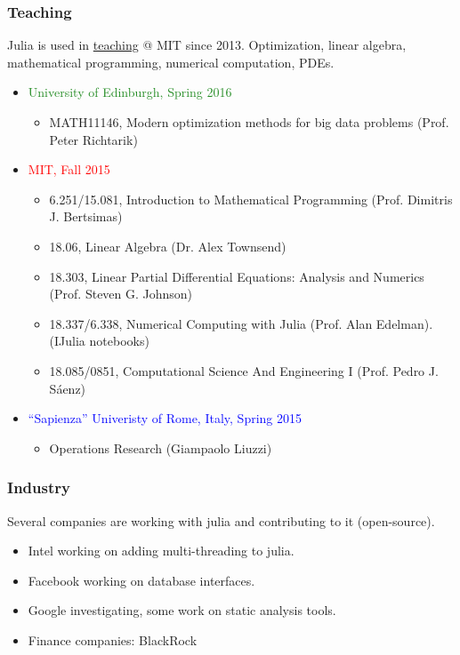 \documentclass[16pt]{beamer}
\begin{document}
\begin{frame}
\frametitle{Teaching}
Julia is used in \href{http://julialang.org/teaching/}{teaching} @ MIT since 2013.
Optimization, linear algebra, mathematical programming, numerical computation, PDEs.

\begin{itemize}
  \item \textcolor{ForestGreen}{University of Edinburgh, Spring 2016}
  \begin{itemize}
    \item MATH11146, Modern optimization methods for big data problems (Prof. Peter Richtarik)
  \end{itemize}
  
  \item \textcolor{red}{MIT, Fall 2015}
  \begin{itemize}
    \item 6.251/15.081, Introduction to Mathematical Programming (Prof. Dimitris J. Bertsimas)
    \item 18.06, Linear Algebra (Dr. Alex Townsend)
    \item 18.303, Linear Partial Differential Equations: Analysis and Numerics (Prof. Steven G. Johnson)
    \item 18.337/6.338, Numerical Computing with Julia (Prof. Alan Edelman). (IJulia notebooks)
    \item 18.085/0851, Computational Science And Engineering I (Prof. Pedro J. Sáenz)
  \end{itemize}
  
  \item \textcolor{blue}{“Sapienza” Univeristy of Rome, Italy, Spring 2015}
  \begin{itemize}
    \item Operations Research (Giampaolo Liuzzi)
  \end{itemize}

\end{itemize}
\end{frame}

\begin{frame}
\frametitle{Industry}
Several companies are working with julia and contributing to it (open-source).

\begin{itemize}
  \item Intel working on adding multi-threading to julia.
  \item Facebook working on database interfaces.
  \item Google investigating, some work on static analysis tools.
  \item Finance companies: BlackRock
\end{itemize}
\end{frame}
\end{document}
